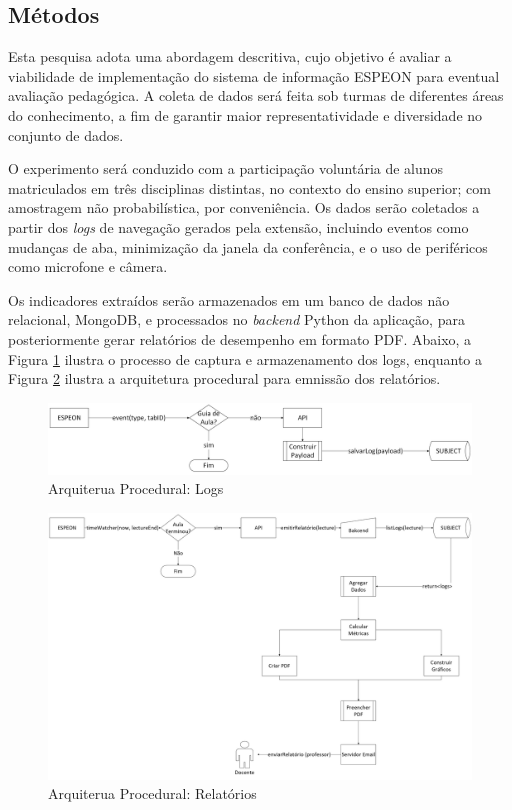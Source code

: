 \subsection{Métodos}\label{sec:methods}
Esta pesquisa adota uma abordagem descritiva, cujo objetivo é avaliar a viabilidade de implementação do sistema de informação ESPEON para eventual avaliação pedagógica. A coleta de dados será feita sob turmas de diferentes áreas do conhecimento, a fim de garantir maior representatividade e diversidade no conjunto de dados.

O experimento será conduzido com a participação voluntária de alunos matriculados em três disciplinas distintas, no contexto do ensino superior; com amostragem não probabilística, por conveniência. Os dados serão coletados a partir dos \textit{logs} de navegação gerados pela extensão, incluindo eventos como mudanças de aba, minimização da janela da conferência, e o uso de periféricos como microfone e câmera.

Os indicadores extraídos serão armazenados em um banco de dados não relacional, MongoDB, e processados no \textit{backend} Python da aplicação, para posteriormente gerar relatórios de desempenho em formato PDF. Abaixo, a Figura \ref{fig:arquiteturaLogs} ilustra o processo de captura e armazenamento dos logs, enquanto a Figura \ref{fig:arquiteturaReports} ilustra a arquitetura procedural para emnissão dos relatórios.

\begin{figure}[ht]
    \centering
    \includegraphics[width=.97\textwidth]{assets/images/arquitetura.logs.png}
    \caption{Arquiterua Procedural: Logs}
    \label{fig:arquiteturaLogs}
\end{figure}

\begin{figure}[ht]
    \centering
    \includegraphics[width=.97\textwidth]{assets/images/arquitetura.reports.png}
    \caption{Arquiterua Procedural: Relatórios}
    \label{fig:arquiteturaReports}
\end{figure}

